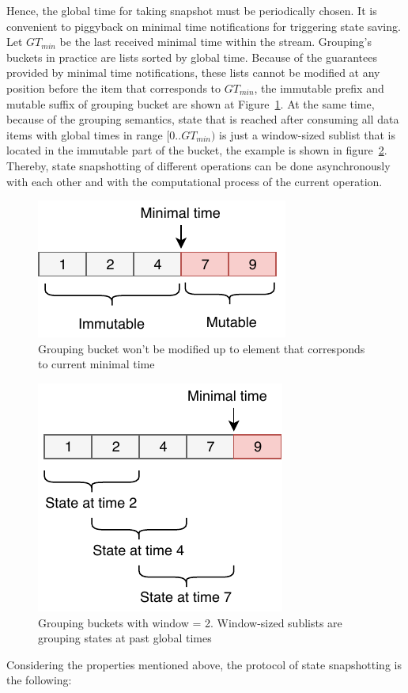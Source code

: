 Hence, the global time for taking snapshot must be periodically chosen. It is convenient to piggyback on minimal time notifications for triggering state saving. Let $GT_{min}$ be the last received minimal time within the stream. Grouping's buckets in practice are lists sorted by global time. Because of the guarantees provided by minimal time notifications, these lists cannot be modified at any position before the item that corresponds to $GT_{min}$, the immutable prefix and mutable suffix of grouping bucket are shown at Figure~\ref{immutable}. At the same time, because of the grouping semantics, state that is reached after consuming all data items with global times in range $[0..GT_{min})$ is just a window-sized sublist that is located in the immutable part of the bucket, the example is shown in figure~\ref{substate}. Thereby, state snapshotting of different operations can be done asynchronously with each other and with the computational process of the current operation. 

\begin{figure}[htbp]
  \centering
  \includegraphics[width=.3\textwidth]{pics/immutable}
  \caption{Grouping bucket won't be modified up to element that corresponds to current minimal time}
  \label {immutable}
\end{figure}

\begin{figure}[htbp]
  \centering
  \includegraphics[width=.3\textwidth]{pics/substate}
  \caption{Grouping buckets with window = 2. Window-sized sublists are grouping states at past global times}
  \label {substate}
\end{figure}

Considering the properties mentioned above, the protocol of state snapshotting is the following:

